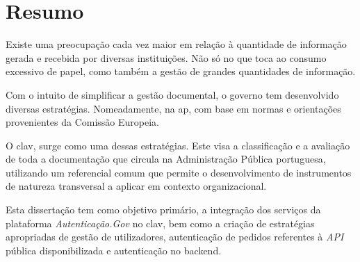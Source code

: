 \chapter*{Resumo}

Existe uma preocupação cada vez maior em relação à quantidade de informação gerada e recebida por diversas instituições. Não só no que toca ao consumo excessivo de papel, como também a gestão de grandes quantidades de informação.

Com o intuito de simplificar a gestão documental, o governo tem desenvolvido diversas estratégias. Nomeadamente, na \gls{ap}, com base em normas e orientações provenientes da Comissão Europeia.

O \gls{clav}, surge como uma dessas estratégias. Este visa a classificação e a avaliação de toda a documentação que circula na Administração Pública portuguesa, utilizando um referencial comum que permite o desenvolvimento de instrumentos de natureza transversal a aplicar em contexto organizacional.

Esta dissertação tem como objetivo primário, a integração dos serviços da plataforma \emph{Autenticação.Gov} no \gls{clav}, bem como a criação de estratégias apropriadas de gestão de utilizadores, autenticação de pedidos referentes à \emph{API} pública disponibilizada e autenticação no backend.